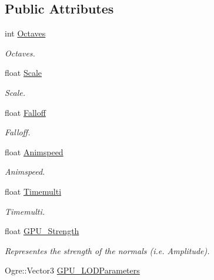 \subsection*{Public Attributes}
\begin{CompactItemize}
\item 
int \hyperlink{struct_hydrax_1_1_noise_1_1_perlin_1_1_options_619c2288fa73c1bae98e475cff6c3e26}{Octaves}
\begin{CompactList}\small\item\em Octaves. \item\end{CompactList}\item 
float \hyperlink{struct_hydrax_1_1_noise_1_1_perlin_1_1_options_06e7bb58600f974065a2d2bdcd6a9f91}{Scale}
\begin{CompactList}\small\item\em Scale. \item\end{CompactList}\item 
float \hyperlink{struct_hydrax_1_1_noise_1_1_perlin_1_1_options_8fdaf68802a6abfa74665e8fd31a54aa}{Falloff}
\begin{CompactList}\small\item\em Falloff. \item\end{CompactList}\item 
float \hyperlink{struct_hydrax_1_1_noise_1_1_perlin_1_1_options_77f9a42f5ebbe148f0c4610f3fe818cd}{Animspeed}
\begin{CompactList}\small\item\em Animspeed. \item\end{CompactList}\item 
float \hyperlink{struct_hydrax_1_1_noise_1_1_perlin_1_1_options_7619c42d9f43aa51d26dd954d56b17c3}{Timemulti}
\begin{CompactList}\small\item\em Timemulti. \item\end{CompactList}\item 
float \hyperlink{struct_hydrax_1_1_noise_1_1_perlin_1_1_options_2c4f7deaf01fdb818adde19b1174c48d}{GPU\_\-Strength}
\begin{CompactList}\small\item\em Representes the strength of the normals (i.e. Amplitude). \item\end{CompactList}\item 
Ogre::Vector3 \hyperlink{struct_hydrax_1_1_noise_1_1_perlin_1_1_options_8abb72bf1ee4792f2627f6bc635d7aa2}{GPU\_\-LODParameters}
\end{CompactItemize}


